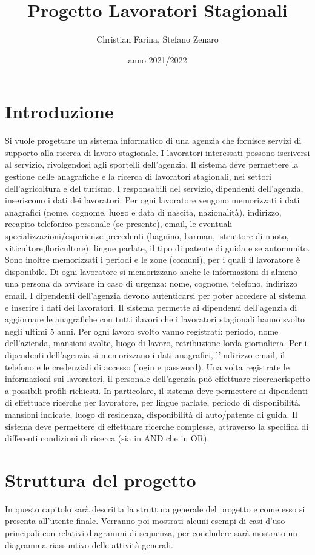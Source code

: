 \documentclass[ 4paper,11pt,openany]{book}
\title{Progetto Lavoratori Stagionali}
\author{Christian Farina,  Stefano Zenaro}
\date{anno 2021/2022}
\begin{document}
\frontmatter
\maketitle
\tableofcontents 

\mainmatter
\chapter{Introduzione}
Si vuole progettare un sistema informatico di una agenzia che fornisce servizi di supporto alla ricerca di lavoro stagionale. I lavoratori interessati possono iscriversi al servizio, rivolgendosi agli sportelli dell’agenzia. Il sistema deve permettere la gestione delle anagrafiche e la ricerca di lavoratori
stagionali, nei settori dell’agricoltura e del turismo. I responsabili del servizio, dipendenti dell’agenzia, inseriscono i dati dei lavoratori. 
Per ogni lavoratore vengono memorizzati i dati anagrafici (nome, cognome, luogo e data di nascita, nazionalità), indirizzo, recapito telefonico personale (se presente), email, le eventuali
specializzazioni/esperienze precedenti (bagnino, barman, istruttore di nuoto, viticultore,floricultore), lingue parlate, il tipo di patente di guida e se automunito. Sono inoltre memorizzati i periodi e le zone (comuni), per i quali il lavoratore è disponibile. Di ogni lavoratore si memorizzano anche le informazioni di almeno una persona da avvisare in caso di urgenza: nome, cognome, telefono, indirizzo email. I dipendenti dell’agenzia devono autenticarsi per poter accedere al sistema e inserire i dati dei lavoratori. Il sistema permette ai dipendenti dell’agenzia di aggiornare le anagrafiche con tutti ilavori che i lavoratori stagionali hanno svolto negli ultimi 5 anni. 
Per ogni lavoro svolto vanno registrati: periodo, nome dell’azienda, mansioni svolte, luogo di lavoro, retribuzione lorda giornaliera. Per i dipendenti dell’agenzia si memorizzano i dati anagrafici, l’indirizzo email, il telefono e le credenziali di accesso (login e password).
Una volta registrate le informazioni sui lavoratori, il personale dell’agenzia può effettuare ricercherispetto a possibili profili richiesti.
In particolare, il sistema deve permettere ai dipendenti di effettuare ricerche per lavoratore, per lingue parlate, periodo di disponibilità, mansioni indicate, luogo di residenza, disponibilità di auto/patente di guida. Il sistema deve permettere di effettuare ricerche complesse, attraverso la specifica di differenti condizioni di ricerca (sia in AND che in OR).
 
\chapter{Struttura del progetto}
In questo capitolo sarà descritta la struttura generale del progetto e come esso si presenta all'utente finale. Verranno poi mostrati alcuni esempi di casi d'uso principali con relativi diagrammi di sequenza, per concludere sarà mostrato un diagramma riassuntivo delle attività generali.
\end{document}
